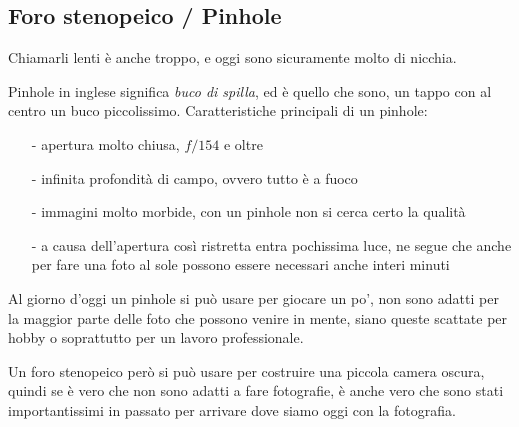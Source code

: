 \subsection{Foro stenopeico / Pinhole} \label{subsec:lentipinhole}
Chiamarli lenti è anche troppo, e oggi sono sicuramente molto di nicchia.

Pinhole in inglese significa \textit{buco di spilla}, ed è quello che sono, un tappo con al centro un buco piccolissimo.\newline
Caratteristiche principali di un pinhole:
\begin{itemize}
    \item[-] apertura molto chiusa, $f/154$ e oltre
    \item[-] infinita profondità di campo, ovvero tutto è a fuoco
    \item[-] immagini molto morbide, con un pinhole non si cerca certo la qualità
    \item[-] a causa dell'apertura così ristretta entra pochissima luce, ne segue che anche per fare una foto al sole possono essere necessari anche interi minuti   
\end{itemize}

Al giorno d'oggi un pinhole si può usare per giocare un po', non sono adatti per la maggior parte delle foto che possono venire in mente, siano queste scattate per hobby o soprattutto per un lavoro professionale.

Un foro stenopeico però si può usare per costruire una piccola camera oscura, quindi se è vero che non sono adatti a fare fotografie, è anche vero che sono stati importantissimi in passato per arrivare dove siamo oggi con la fotografia.